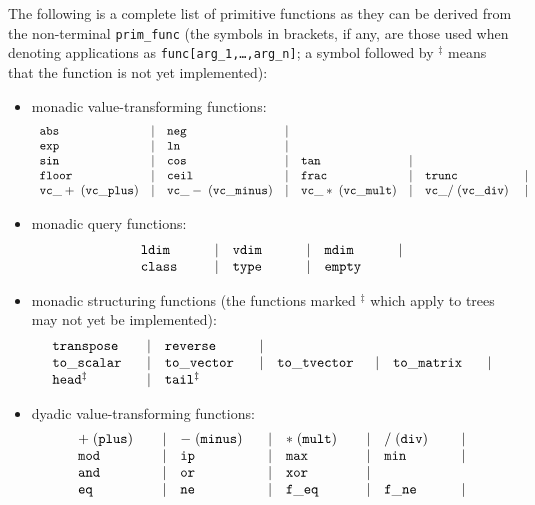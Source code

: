 The following is a complete list of {\mys primitive functions} as they can be derived from the non-terminal {\tt prim\_func}
(the symbols in brackets, if
any, are
those used when denoting applications as
 {\tt func[arg\_1,\ldots,arg\_n]}; a symbol followed by $^\ddagger$
 means that the function is not yet
implemented):
\begin{itemize}
\item {\mys monadic value-transforming functions}:
$$
\begin{array}{lclclclc}
{\tt abs} &|& {\tt neg}&|\\
{\tt exp} &|& {\tt ln} &|\\
{\tt sin} &|& {\tt cos} &|& {\tt tan} &|\\
{\tt floor} &|& {\tt ceil} &|& {\tt frac} &|& {\tt trunc} &|\\
{\tt vc\_+\;(vc\_plus)} &|& {\tt vc\_-\;(vc\_minus)} &|& {\tt vc\_*\;(vc\_mult)} &|& {\tt vc\_/\;(vc\_div)}\; &|\\
\end{array}
$$
\item {\mys monadic query functions}:
$$
\begin{array}{lclclc}
{\tt ldim}\;\;\;\;\;\;\;\; &|& {\tt vdim}\;\;\;\;\;\;\;\; &|& {\tt mdim}\;\;\;\;\;\;\;\; &|\\
 {\tt class} &|& {\tt type} &|& {\tt empty}
\end{array}
$$
\item {\mys monadic structuring functions} (the functions marked $^\ddagger$
 which apply
to trees may not yet be implemented):
$$
\begin{array}{lclclclc}
{\tt transpose} &|& {\tt reverse} &|\\
 {\tt to\_scalar}\;\;\; &|& {\tt to\_vector}\;\;\; &|& {\tt to\_tvector}\;\; &|& {\tt to\_matrix}\;\;\; &| \\
{\tt head ^\ddagger
} &|& {\tt tail ^\ddagger
} &\\
\end{array}
$$
\item {\mys dyadic value-transforming functions}: 
$$
\begin{array}{lclclclc}
{\tt +\; (plus)}\;\;\;\; &|& {\tt -\;(minus)}\;\;\; &|& {\tt *\;(mult)}\;\;\;\; &|& {\tt /\;(div)}\;\;\;\;\; &|\\
{\tt mod}  &|& {\tt ip} &|& {\tt max} &|& {\tt min} &|\\
{\tt and} &|& {\tt or} &|& {\tt xor} &|\\
{\tt eq} &|& {\tt ne} &|& {\tt f\_eq}  &|& {\tt f\_ne} &|\\

\end{array}$$
\end{itemize}
